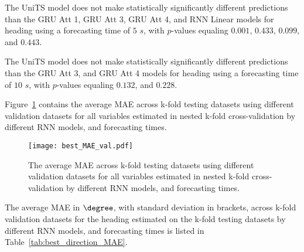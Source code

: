 The UniTS model does not make statistically significantly different predictions than the GRU Att 1, GRU Att 3, GRU Att 4, and RNN Linear models for heading using a forecasting time of $5$ $s$, with $p$-values equaling $0.001$, $0.433$, $0.099$, and $0.443$.


The UniTS model does not make statistically significantly different predictions than the GRU Att 3, and GRU Att 4 models for heading using a forecasting time of $10$ $s$, with $p$-values equaling $0.132$, and $0.228$.


Figure~\ref{fig:best_MAE_val} contains the average MAE across k-fold testing datasets using different validation datasets for all variables estimated in nested k-fold cross-validation by different RNN models, and forecasting times.

\begin{figure}[!ht]
	\centering
	\texttt{[image: best\_MAE\_val.pdf]}
	\caption{The average MAE across k-fold testing datasets using different validation datasets for all variables estimated in nested k-fold cross-validation by different RNN models, and forecasting times.}
	\label{fig:best_MAE_val}
\end{figure}

The average MAE in $\degree$, with standard deviation in brackets, across k-fold validation datasets for the heading estimated on the k-fold testing datasets by different RNN models, and forecasting times is listed in Table~\ref{tab:best_direction_MAE}.

\begin{table}[!ht]
	\centering
	\caption{The average MAE in $\degree$, with standard deviation in brackets, across k-fold validation datasets for the heading estimated on the k-fold testing datasets by different RNN models, and forecasting times.}
	\label{tab:best_direction_MAE}
\end{table}


